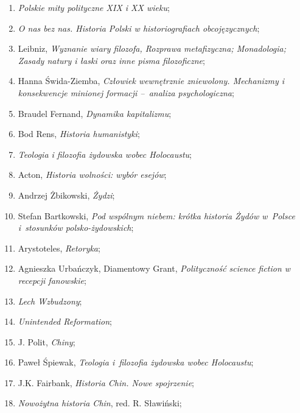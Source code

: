 \documentclass[a4paper,11pt]{article}
\begin{document}
\begin{enumerate}
\item \textit{Polskie mity polityczne XIX i XX wieku};

\item \textit{O nas bez nas. Historia Polski w historiografiach
    obcojęzycznych};

\item Leibniz, \textit{Wyznanie wiary filozofa, Rozprawa metafizyczna;
    Monadologia; Zasady natury i łaski oraz inne pisma filozoficzne};

\item Hanna Świda-Ziemba, \textit{Człowiek wewnętrznie zniewolony.
    Mechanizmy i konsekwencje minionej formacji --~analiza
    psychologiczna};

\item Braudel Fernand, \textit{Dynamika kapitalizmu};

\item Bod Rens, \textit{Historia humanistyki};

\item \textit{Teologia i filozofia żydowska wobec Holocaustu};

\item Acton, \textit{Historia wolności: wybór esejów};

\item Andrzej Żbikowski, \textit{Żydzi};

\item Stefan Bartkowski, \textit{Pod wspólnym niebem: krótka historia
    Żydów w~Polsce i~stosunków polsko-żydowskich};

\item Arystoteles, \textit{Retoryka};

\item Agnieszka Urbańczyk, Diamentowy Grant, \textit{Polityczność
    science fiction w recepcji fanowskie};

\item \textit{Lech Wzbudzony};

\item \textit{Unintended Reformation};

\item J. Polit, \textit{Chiny};

\item Paweł Śpiewak, \textit{Teologia i~filozofia żydowska wobec
    Holocaustu};

\item J.K. Fairbank, \textit{Historia Chin. Nowe spojrzenie};

\item \textit{Nowożytna historia Chin}, red. R. Sławiński;


\end{enumerate}
\end{document}
